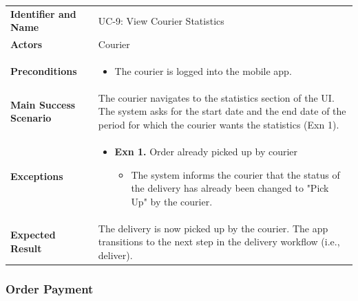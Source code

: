 \noindent
\begin{tabularx}{\textwidth}{l X}
    \textbf{Identifier and Name} & UC-9: View Courier Statistics \\
    \textbf{Actors} & Courier \\
    \textbf{Preconditions} & 
    \begin{itemize} 
        \item The courier is logged into the mobile app.
    \end{itemize} \\
    \textbf{Main Success Scenario} & The courier navigates to the statistics section of the UI. The system asks for the start date and the end date of the period for which the courier wants the statistics (Exn 1). \\
    \textbf{Exceptions} & 
    \begin{itemize} 
        \item \textbf{Exn 1.} Order already picked up by courier
        \begin{itemize}
            \item The system informs the courier that the status of the delivery has already been changed to "Pick Up" by the courier.
        \end{itemize}
    \end{itemize} \\
    \textbf{Expected Result} & The delivery is now picked up by the courier. The app transitions to the next step in the delivery workflow (i.e., deliver).
\end{tabularx}

\subsubsection{Order Payment}

